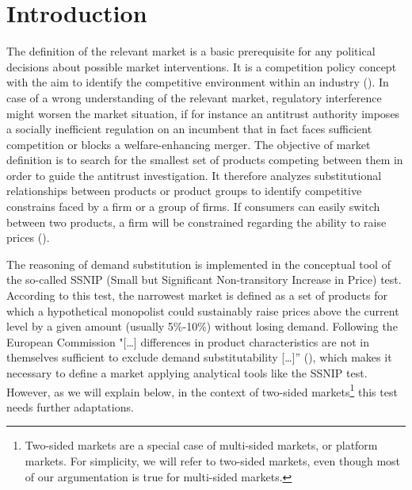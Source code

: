 \documentclass[10pt,a4paper]{scrreprt}
\begin{document}
\chapter{Introduction}
The definition of the relevant market is a basic prerequisite for any political decisions about possible market interventions. It is a competition policy concept with the aim to identify the competitive environment within an industry (\cite{argentesi_market_2005}). In case of a wrong understanding of the relevant market, regulatory interference might worsen the market situation, if for instance an antitrust authority imposes a socially inefficient regulation on an incumbent that in fact faces sufficient competition or blocks a welfare-enhancing merger. The objective of market definition is to search for the smallest set of products competing between them in order to guide the antitrust investigation. It therefore analyzes substitutional relationships between products or product groups to identify competitive constrains faced by a firm or a group of firms. If consumers can easily switch between two products, a firm will be constrained regarding the ability to raise prices (\cite{filistrucchi_market_2013}).

The reasoning of demand substitution is implemented in the conceptual tool of the so-called SSNIP (Small but Significant Non-transitory Increase in Price) test. According to this test, the narrowest market is defined as a set of products for which a hypothetical monopolist could sustainably raise prices above the current level by a given amount (usually 5\%-10\%) without losing demand. Following the European Commission "[…] differences in product characteristics are not in themselves sufficient to exclude demand substitutability […]” (\cite{european_commission_commission_1997}), which makes it necessary to define a market applying analytical tools like the SSNIP test. However, as we will explain below, in the context of two-sided markets\footnote{Two-sided markets are a special case of multi-sided markets, or platform markets. For simplicity, we will refer to two-sided markets, even though most of our argumentation is true for multi-sided markets.} this test needs further adaptations.
\end{document}
